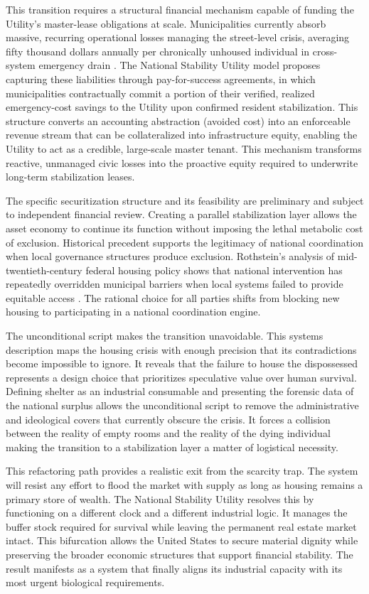 \documentclass[12pt, letterpaper]{article}
\begin{document}
This transition requires a structural financial mechanism capable of funding the Utility's master-lease obligations at scale. Municipalities currently absorb massive, recurring operational losses managing the street-level crisis, averaging fifty thousand dollars annually per chronically unhoused individual in cross-system emergency drain \citep{calmatters_2026}. The National Stability Utility model proposes capturing these liabilities through pay-for-success agreements, in which municipalities contractually commit a portion of their verified, realized emergency-cost savings to the Utility upon confirmed resident stabilization. This structure converts an accounting abstraction (avoided cost) into an enforceable revenue stream that can be collateralized into infrastructure equity, enabling the Utility to act as a credible, large-scale master tenant. This mechanism transforms reactive, unmanaged civic losses into the proactive equity required to underwrite long-term stabilization leases.

The specific securitization structure and its feasibility are preliminary and subject to independent financial review. Creating a parallel stabilization layer allows the asset economy to continue its function without imposing the lethal metabolic cost of exclusion. Historical precedent supports the legitimacy of national coordination when local governance structures produce exclusion. Rothstein's analysis of mid-twentieth-century federal housing policy shows that national intervention has repeatedly overridden municipal barriers when local systems failed to provide equitable access \citep{rothstein_2017}. The rational choice for all parties shifts from blocking new housing to participating in a national coordination engine.

The unconditional script makes the transition unavoidable. This systems description maps the housing crisis with enough precision that its contradictions become impossible to ignore. It reveals that the failure to house the dispossessed represents a design choice that prioritizes speculative value over human survival. Defining shelter as an industrial consumable and presenting the forensic data of the national surplus allows the unconditional script to remove the administrative and ideological covers that currently obscure the crisis. It forces a collision between the reality of empty rooms and the reality of the dying individual making the transition to a stabilization layer a matter of logistical necessity.

This refactoring path provides a realistic exit from the scarcity trap. The system will resist any effort to flood the market with supply as long as housing remains a primary store of wealth. The National Stability Utility resolves this by functioning on a different clock and a different industrial logic. It manages the buffer stock required for survival while leaving the permanent real estate market intact. This bifurcation allows the United States to secure material dignity while preserving the broader economic structures that support financial stability. The result manifests as a system that finally aligns its industrial capacity with its most urgent biological requirements.
\end{document}
